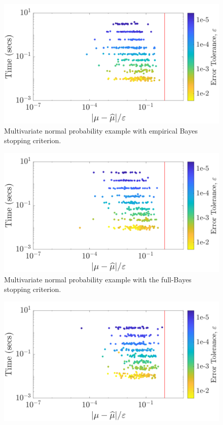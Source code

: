\documentclass{svjour3}                     %
\begin{document}
{{{{{{\begin{figure}
\centering
\includegraphics[width=0.95\linewidth]{"figures/Sobol/Sobol_MVN_guaranteed_time_MLE__d2_r1_2019-Sep-1"}
\caption[Sobol: MVN guaranteed: MLE]{Multivariate normal probability example with empirical Bayes stopping criterion.}
\label{fig:Sobol-mvn-guaranteed-MLE}
\end{figure}
\begin{figure}
\centering
\includegraphics[width=0.95\linewidth]{"figures/Sobol/Sobol_MVN_guaranteed_time_full__d2_r1_2019-Sep-1"}
\caption[Sobol: MVN guaranteed: Full Bayes]{Multivariate normal probability example with the full-Bayes stopping criterion.}
\label{fig:Sobol-mvn-guaranteed-FB}
\end{figure}
\begin{figure}
\centering
\includegraphics[width=0.95\linewidth]{"figures/Sobol/Sobol_MVN_guaranteed_time_GCV__d2_r1_2019-Sep-1"}

\end{figure}}}}}}}
\end{document}
